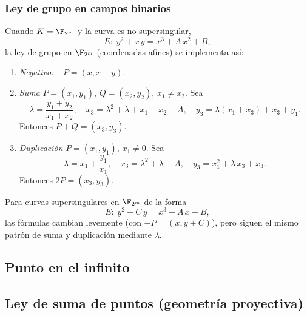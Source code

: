 \subsubsection*{Ley de grupo en campos binarios}

Cuando \(K = \F_{2^m}\) y la curva es no supersingular,
\[
  E\colon\;y^2 + x\,y = x^3 + A\,x^2 + B,
\]
la ley de grupo en \(\F_{2^m}\) (coordenadas afines) se implementa así:

\begin{enumerate}
  \item \emph{Negativo:} \(-P = (x,x+y)\).
  \item \emph{Suma} \(P=(x_1,y_1)\), \(Q=(x_2,y_2)\), \(x_1\neq x_2\). Sea
    \[
      \lambda = \frac{y_1 + y_2}{x_1 + x_2},\quad
      x_3 = \lambda^2 + \lambda + x_1 + x_2 + A,\quad
      y_3 = \lambda(x_1 + x_3) + x_3 + y_1.
    \]
    Entonces \(P + Q = (x_3,y_3)\).
  \item \emph{Duplicación} \(P=(x_1,y_1)\), \(x_1\neq0\). Sea
    \[
      \lambda = x_1 + \frac{y_1}{x_1},\quad
      x_3 = \lambda^2 + \lambda + A,\quad
      y_3 = x_1^2 + \lambda\,x_3 + x_3.
    \]
    Entonces \(2P = (x_3,y_3)\).
\end{enumerate}

Para curvas supersingulares en \(\F_{2^m}\) de la forma
\[
  E\colon\;y^2 + C\,y = x^3 + A\,x + B,
\]
las fórmulas cambian levemente (con \(-P=(x,y+C)\)), pero siguen el mismo patrón de suma y duplicación mediante \(\lambda\).



\subsection{Punto en el infinito}
\subsection{Ley de suma de puntos (geometría proyectiva)}

